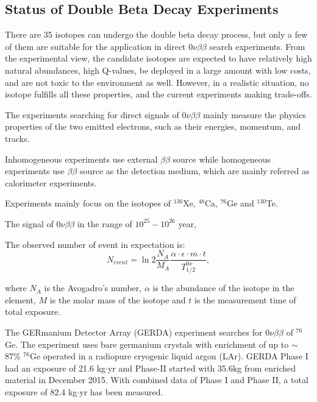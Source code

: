 \subsection{Status of Double Beta Decay Experiments}

There are 35 isotopes can undergo the double beta decay process, but only a few of them are suitable for the application in direct $0\nu\beta\beta$ search experiments\cite{giunti2007fundamentals}. From the experimental view, the candidate isotopes are expected to have relatively high natural abundances, high Q-values, be deployed in a large amount with low costs, and are not toxic to the environment as well. However, in a realistic situation, no isotope fulfills all these properties, and the current experiments making trade-offs\cite{dolinski2019neutrinoless}.

The experiments searching for direct signals of $0\nu\beta\beta$ mainly measure the physics properties of the two emitted electrons, such as their energies, momentum, and tracks. 

Inhomogeneous experiments use external $\beta\beta$ source
while homogeneous experiments use $\beta\beta$ source as the detection medium, which are mainly referred as calorimeter experiments\cite{cremonesi2014challenges,shimizu2019double}.


Experiments mainly focus on the isotopes of $^{136}$Xe, $^{48}$Ca, $^{76}$Ge and $^{130}$Te.


The signal of $0\nu\beta\beta$ in the range of $10^{25}-10^{26}$ year,

The observed number of event in expectation is: 
\[
N_{event} = \ln 2 \frac{N_A}{M_A}\frac{\alpha\cdot\epsilon\cdot m\cdot t}{T^{0\nu}_{1/2}},
\]

where $N_A$ is the Avogadro's number, $\alpha$ is the abundance of the isotope in the element, 
$M$ is the molar mass of the isotope
and $t$ is the measurement time of total exposure.

The GERmanium Detector Array (GERDA) experiment searches for $0\nu\beta\beta$ of $^{76}$Ge. The experiment uses bare germanium crystals with enrichment of up to $\sim$87\% $^{76}$Ge operated in a radiopure cryogenic liquid argon (LAr)\cite{agostini2016search}. GERDA Phase I had an exposure of 21.6 kg$\cdot$yr and Phase-II started with 35.6kg from enriched material in December 2015. With combined data of Phase I and Phase II, a total exposure of 82.4 kg$\cdot$yr has been measured.

